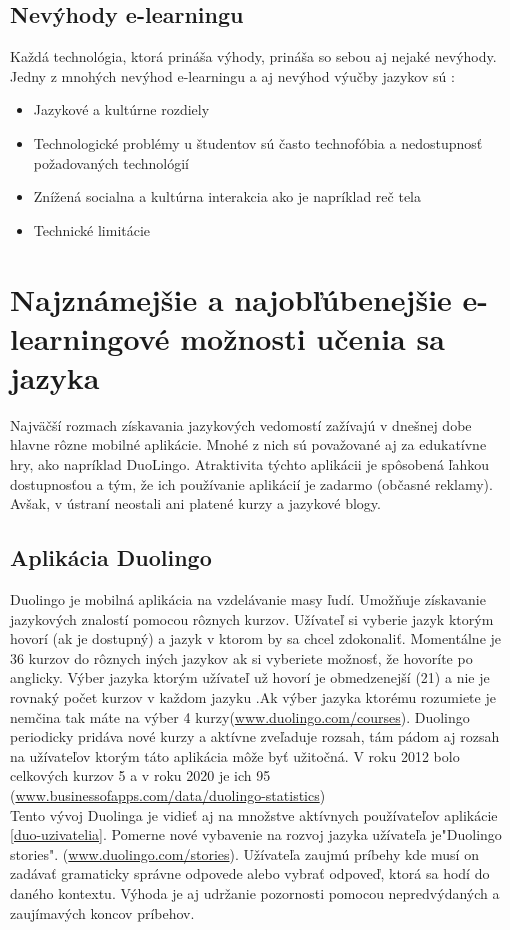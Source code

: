 \documentclass[10pt,oneside,slovak,a4paper]{article}
\begin{document}
\subsection{Nevýhody e-learningu}%
Každá technológia, ktorá prináša výhody, prináša so sebou aj nejaké nevýhody. Jedny z mnohých nevýhod e-learningu a aj nevýhod výučby jazykov sú :

\begin{itemize}
\item Jazykové a kultúrne rozdiely \cite{efektivnost}
\item Technologické problémy u študentov sú často technofóbia a nedostupnosť požadovaných technológií \cite{nevyhody}
\item Znížená socialna a kultúrna interakcia ako je napríklad reč tela \cite{nevyhody}
\item Technické limitácie\cite{efektivnost}
\end{itemize}

\section{Najznámejšie a najobľúbenejšie e-learningové možnosti učenia sa jazyka}%
Najväčší rozmach získavania jazykových vedomostí zažívajú v dnešnej dobe hlavne rôzne mobilné aplikácie. Mnohé z nich sú považované aj za edukatívne hry, ako napríklad DuoLingo. Atraktivita týchto aplikácii je spôsobená ľahkou dostupnosťou a tým, že ich používanie aplikácií je zadarmo (občasné reklamy). Avšak, v ústraní neostali ani platené kurzy a jazykové blogy.

\subsection{Aplikácia Duolingo}%
Duolingo je mobilná aplikácia na vzdelávanie masy ľudí. Umožňuje získavanie jazykových znalostí pomocou rôznych kurzov. Užívateľ si vyberie jazyk ktorým hovorí (ak je dostupný) a jazyk v ktorom by sa chcel zdokonaliť. Momentálne je 36 kurzov do rôznych iných jazykov ak si vyberiete možnosť, že hovoríte po anglicky. Výber jazyka ktorým užívateľ už hovorí je obmedzenejší (21) a nie je rovnaký počet kurzov v každom jazyku .Ak výber jazyka ktorému rozumiete je nemčina tak máte na výber 4 kurzy(\href{https://www.duolingo.com/courses}{www.duolingo.com/courses}).
Duolingo periodicky pridáva nové kurzy a aktívne zveľaduje rozsah, tám pádom aj rozsah na užívateľov ktorým táto aplikácia môže byť užitočná. V roku 2012 bolo celkových kurzov 5 a v roku 2020 je ich 95 (\href{https://www.businessofapps.com/data/duolingo-statistics/}{www.businessofapps.com/data/duolingo-statistics})\\ Tento vývoj Duolinga je vidieť aj na množstve aktívnych používateľov aplikácie \ref{duo-uzivatelia}. Pomerne nové vybavenie na rozvoj jazyka užívateľa je"Duolingo stories". (\href{https://www.duolingo.com/stories/}{www.duolingo.com/stories}). Užívateľa zaujmú príbehy kde musí on zadávať gramaticky správne odpovede alebo vybrať odpoveď, ktorá sa hodí do daného kontextu. Výhoda je aj udržanie pozornosti pomocou nepredvýdaných a zaujímavých koncov príbehov.
\end{document}
